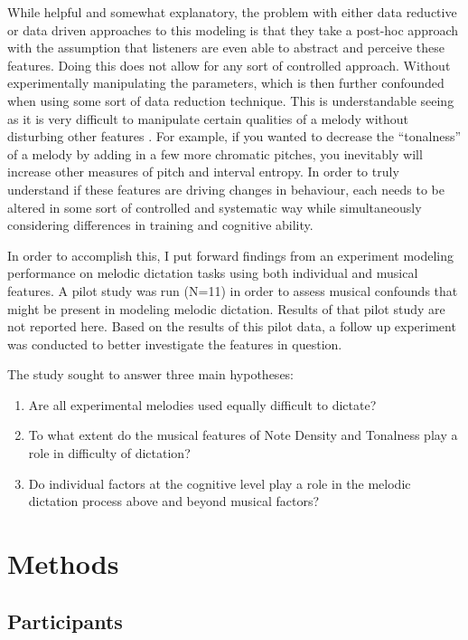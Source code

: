 \documentclass[12pt,]{book}
\providecommand{\tightlist}{%
  \setlength{\itemsep}{0pt}\setlength{\parskip}{0pt}}
\begin{document}
While helpful and somewhat explanatory, the problem with either data reductive or data driven approaches to this modeling is that they take a post-hoc approach with the assumption that listeners are even able to abstract and perceive these features.
Doing this does not allow for any sort of controlled approach.
Without experimentally manipulating the parameters, which is then further confounded when using some sort of data reduction technique.
This is understandable seeing as it is very difficult to manipulate certain qualities of a melody without disturbing
other features \citep{taylorStrategiesMemoryShort1983}.
For example, if you wanted to decrease the ``tonalness'' of a melody by adding in a few more chromatic pitches, you inevitably will increase other measures of pitch and interval entropy.
In order to truly understand if these features are driving changes in behaviour, each needs to be altered in some sort of controlled and systematic way while simultaneously considering differences in training and cognitive ability.

In order to accomplish this, I put forward findings from an experiment modeling performance on melodic dictation tasks using both individual and musical features.
A pilot study was run (N=11) in order to assess musical confounds that might be present in modeling melodic dictation.
Results of that pilot study are not reported here.
Based on the results of this pilot data, a follow up experiment was conducted to better investigate the features in question.

The study sought to answer three main hypotheses:

\begin{enumerate}
\def\labelenumi{\arabic{enumi}.}
\tightlist
\item
  Are all experimental melodies used equally difficult to
  dictate?
\item
  To what extent do the musical features of Note Density
  and Tonalness play a role in difficulty of dictation?
\item
  Do individual factors at the cognitive level play a role
  in the melodic dictation process above and beyond musical
  factors?
\end{enumerate}

\hypertarget{methods-1}{%
\section{Methods}\label{methods-1}}

\hypertarget{participants-1}{%
\subsection{Participants}\label{participants-1}}
\end{document}
